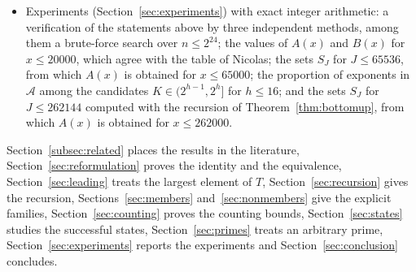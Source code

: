 \documentclass[11pt]{amsart}
\theoremstyle{definition}
\begin{document}
\begin{itemize}
\item Experiments (Section~\ref{sec:experiments}) with exact integer arithmetic: a verification of the statements above by three independent methods, among them a brute-force search over $n\le2^{24}$; the values of $A(x)$ and $B(x)$ for $x\le20000$, which agree with the table of Nicolas; the sets $S_J$ for $J\le65536$, from which $A(x)$ is obtained for $x\le65000$; the proportion of exponents in $\mathcal{A}$ among the candidates $K\in(2^{h-1},2^h]$ for $h\le16$; and the sets $S_J$ for $J\le262144$ computed with the recursion of Theorem~\ref{thm:bottomup}, from which $A(x)$ is obtained for $x\le262000$.
\end{itemize}

Section~\ref{subsec:related} places the results in the literature, Section~\ref{sec:reformulation} proves the identity and the equivalence, Section~\ref{sec:leading} treats the largest element of $T$, Section~\ref{sec:recursion} gives the recursion, Sections~\ref{sec:members} and~\ref{sec:nonmembers} give the explicit families, Section~\ref{sec:counting} proves the counting bounds, Section~\ref{sec:states} studies the successful states, Section~\ref{sec:primes} treats an arbitrary prime, Section~\ref{sec:experiments} reports the experiments and Section~\ref{sec:conclusion} concludes.
\end{document}
